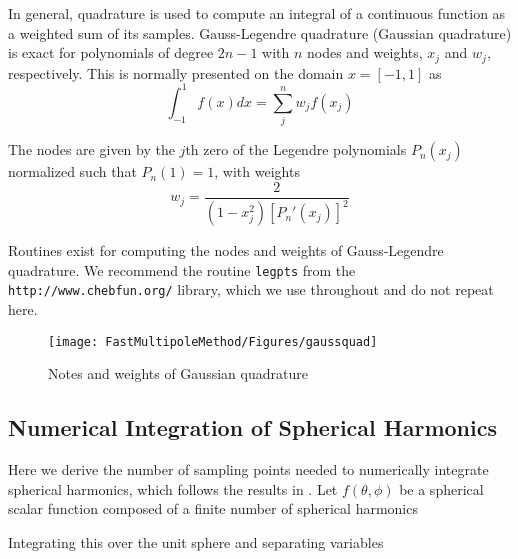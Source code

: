 In general, quadrature is used to compute an integral of a continuous function as a weighted sum of its samples. Gauss-Legendre quadrature (Gaussian quadrature) is exact for polynomials of degree $2n-1$ with $n$ nodes and weights, $x_j$ and $w_j$, respectively.  This is normally presented on the domain $x = [-1, 1]$ as 
\begin{equation}
\int_{-1}^{1} f(x) dx = \sum_j^n w_j f(x_j)
\end{equation}

The nodes are given by the $j$th zero of the Legendre polynomials $P_n(x_j)$ normalized such that $P_n(1) = 1$, with weights 
\begin{equation}
w_j = \dfrac{2}{(1-x_j^2)\left[P_n'(x_j) \right]^2}
\end{equation}

Routines exist for computing the nodes and weights of Gauss-Legendre quadrature. We recommend the routine \texttt{legpts} from the \texttt{http://www.chebfun.org/} library, which we use throughout and do not repeat here.

 \begin{figure}[H] 
   \centering
   \texttt{[image: FastMultipoleMethod/Figures/gaussquad]} 
   \caption{Notes and weights of Gaussian quadrature}
   \label{}
\end{figure}

\clearpage
{}
\subsection{Numerical Integration of Spherical Harmonics}

Here we derive the number of sampling points needed to numerically integrate spherical harmonics, which follows the results in \cite{darve2000fast}.  Let $f(\theta,\phi)$ be a spherical scalar function composed of a finite number of spherical harmonics

Integrating this over the unit sphere and separating variables

